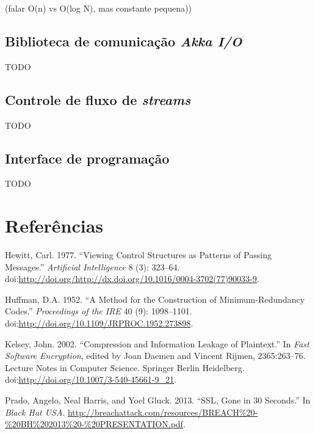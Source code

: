 \documentclass[12pt,a4paper,openright,twoside,english,brazil,]{abntex2}	%
\begin{document}
(falar O(n) vs O(log N), mas constante pequena))

\subsection{\texorpdfstring{Biblioteca de comunicação \emph{Akka
I/O}}{Biblioteca de comunicação Akka I/O}}\label{biblioteca-de-comunicauxe7uxe3o-akka-io}

TODO

\subsection{\texorpdfstring{Controle de fluxo de
\emph{streams}}{Controle de fluxo de streams}}\label{controle-de-fluxo-de-streams}

TODO

\subsection{Interface de
programação}\label{interface-de-programauxe7uxe3o}

TODO

\postextual

\section*{Referências}\label{referuxeancias}

Hewitt, Carl. 1977. ``Viewing Control Structures as Patterns of Passing
Messages.'' \emph{Artificial Intelligence} 8 (3): 323--64.
doi:\url{http://doi.org/http://dx.doi.org/10.1016/0004-3702(77)90033-9}.

Huffman, D.A. 1952. ``A Method for the Construction of
Minimum-Redundancy Codes.'' \emph{Proceedings of the IRE} 40 (9):
1098--1101. doi:\url{http://doi.org/10.1109/JRPROC.1952.273898}.

Kelsey, John. 2002. ``Compression and Information Leakage of
Plaintext.'' In \emph{Fast Software Encryption}, edited by Joan Daemen
and Vincent Rijmen, 2365:263--76. Lecture Notes in Computer Science.
Springer Berlin Heidelberg.
doi:\url{http://doi.org/10.1007/3-540-45661-9_21}.

Prado, Angelo, Neal Harris, and Yoel Gluck. 2013. ``SSL, Gone in 30
Seconds.'' In \emph{Black Hat USA}.
\url{http://breachattack.com/resources/BREACH\%20-\%20BH\%202013\%20-\%20PRESENTATION.pdf}.	%
\end{document}
